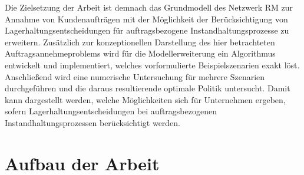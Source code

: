 
Die Zielsetzung der Arbeit ist demnach das Grundmodell des Netzwerk RM zur Annahme von Kundenaufträgen mit der Möglichkeit der Berücksichtigung von Lagerhaltungsentscheidungen für auftragsbezogene Instandhaltungsprozesse zu erweitern. Zusätzlich zur konzeptionellen Darstellung des hier betrachteten Auftragsannehmeproblems wird für die Modellerweiterung ein Algorithmus entwickelt und implementiert, welches vorformulierte Beispielszenarien exakt löst. Anschließend wird eine numerische Untersuchung für mehrere Szenarien durchgeführen und die daraus resultierende optimale Politik untersucht. Damit kann dargestellt werden, welche Möglichkeiten sich für Unternehmen ergeben, sofern Lagerhaltungsentscheidungen bei auftragsbezogenen Instandhaltungsprozessen berücksichtigt werden.

\section{Aufbau der Arbeit}


